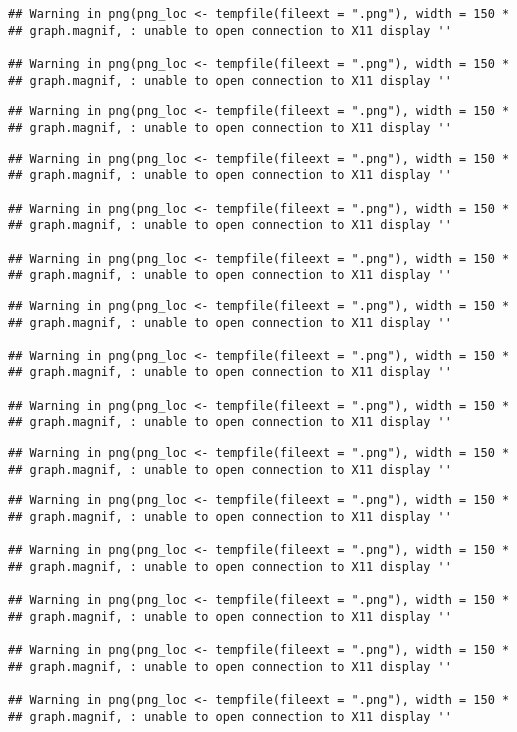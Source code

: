 \documentclass[]{article}
\begin{document}
\begin{verbatim}
## Warning in png(png_loc <- tempfile(fileext = ".png"), width = 150 *
## graph.magnif, : unable to open connection to X11 display ''

## Warning in png(png_loc <- tempfile(fileext = ".png"), width = 150 *
## graph.magnif, : unable to open connection to X11 display ''
\end{verbatim}

\begin{verbatim}
## Warning in png(png_loc <- tempfile(fileext = ".png"), width = 150 *
## graph.magnif, : unable to open connection to X11 display ''
\end{verbatim}

\begin{verbatim}
## Warning in png(png_loc <- tempfile(fileext = ".png"), width = 150 *
## graph.magnif, : unable to open connection to X11 display ''

## Warning in png(png_loc <- tempfile(fileext = ".png"), width = 150 *
## graph.magnif, : unable to open connection to X11 display ''

## Warning in png(png_loc <- tempfile(fileext = ".png"), width = 150 *
## graph.magnif, : unable to open connection to X11 display ''
\end{verbatim}

\begin{verbatim}
## Warning in png(png_loc <- tempfile(fileext = ".png"), width = 150 *
## graph.magnif, : unable to open connection to X11 display ''

## Warning in png(png_loc <- tempfile(fileext = ".png"), width = 150 *
## graph.magnif, : unable to open connection to X11 display ''

## Warning in png(png_loc <- tempfile(fileext = ".png"), width = 150 *
## graph.magnif, : unable to open connection to X11 display ''
\end{verbatim}

\begin{verbatim}
## Warning in png(png_loc <- tempfile(fileext = ".png"), width = 150 *
## graph.magnif, : unable to open connection to X11 display ''
\end{verbatim}

\begin{verbatim}
## Warning in png(png_loc <- tempfile(fileext = ".png"), width = 150 *
## graph.magnif, : unable to open connection to X11 display ''

## Warning in png(png_loc <- tempfile(fileext = ".png"), width = 150 *
## graph.magnif, : unable to open connection to X11 display ''

## Warning in png(png_loc <- tempfile(fileext = ".png"), width = 150 *
## graph.magnif, : unable to open connection to X11 display ''

## Warning in png(png_loc <- tempfile(fileext = ".png"), width = 150 *
## graph.magnif, : unable to open connection to X11 display ''

## Warning in png(png_loc <- tempfile(fileext = ".png"), width = 150 *
## graph.magnif, : unable to open connection to X11 display ''
\end{verbatim}
\end{document}
